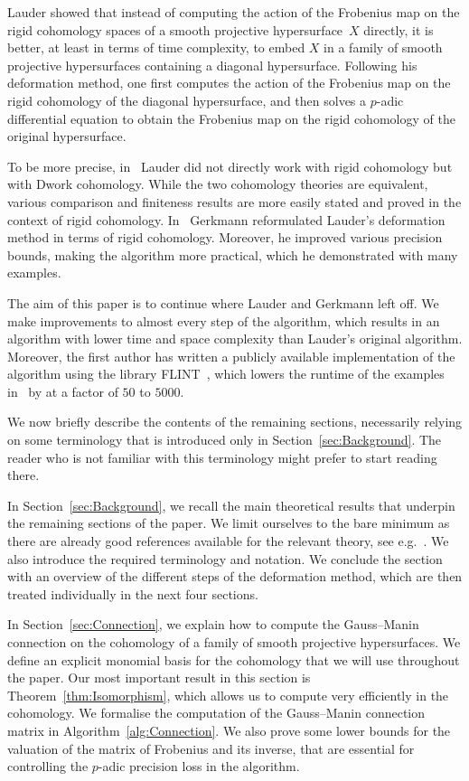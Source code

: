 \documentclass[a4paper,11pt]{article}
\numberwithin{equation}{section}
\theoremstyle{definition}
\begin{document}
Lauder \citep{Lauder2004a,Lauder2004b} showed that instead of computing the 
action of the Frobenius map on the rigid cohomology spaces of a smooth 
projective hypersurface~$X$ directly, it is better, at least in terms of 
time complexity, to embed $X$ in a family of smooth projective hypersurfaces 
containing a diagonal hypersurface.  Following his deformation method, 
one first computes the action of the Frobenius map on the rigid cohomology 
of the diagonal hypersurface, and then solves a $p$-adic differential equation 
to obtain the Frobenius map on the rigid cohomology of the original 
hypersurface. 

To be more precise, in~\citep{Lauder2004a,Lauder2004b} Lauder did not directly 
work with rigid cohomology but with Dwork cohomology. While the two 
cohomology theories are equivalent, various comparison and finiteness results 
are more easily stated and proved in the context of rigid cohomology.  In~\citep{Gerkmann2007} 
Gerkmann reformulated Lauder's deformation method in terms of rigid 
cohomology.  Moreover, he improved various precision bounds, making 
the algorithm more practical, which he demonstrated with many examples.

The aim of this paper is to continue where Lauder and Gerkmann left off. 
We make improvements to almost every step of the algorithm, which results in 
an algorithm with lower time and space complexity than Lauder's original 
algorithm. Moreover, the first author has written a publicly available 
implementation of the algorithm using the library FLINT~\citep{FLINT}, which  
lowers the runtime of the examples in~\citep{Gerkmann2007} by at a factor 
of $50$ to $5000$.

We now briefly describe the contents of the remaining sections,
necessarily relying on some terminology that is introduced only 
in Section~\ref{sec:Background}.  The reader who is not familiar 
with this terminology might prefer to start reading there.

In Section~\ref{sec:Background}, we recall the main theoretical results that 
underpin the remaining sections of the paper.  We limit ourselves to the bare 
minimum as there are already good references available for the relevant theory, 
see e.g.~\citep{Kedlaya2012}. We also introduce the required terminology and 
notation. We conclude the section with an overview of the different steps of 
the deformation method, which are then treated individually in the next four 
sections.

In Section~\ref{sec:Connection}, we explain how to compute the Gauss--Manin 
connection on the cohomology of a family of smooth projective hypersurfaces. 
We define an explicit monomial basis for the cohomology that we will use 
throughout the paper. Our most important result in this section
is Theorem~\ref{thm:Isomorphism}, which allows us to compute very efficiently 
in the cohomology. We formalise the computation of the Gauss--Manin connection 
matrix in Algorithm~\ref{alg:Connection}. We also prove some lower bounds for 
the valuation of the matrix of Frobenius and its inverse, that are essential 
for controlling the $p$-adic precision loss in the algorithm.
\end{document}
